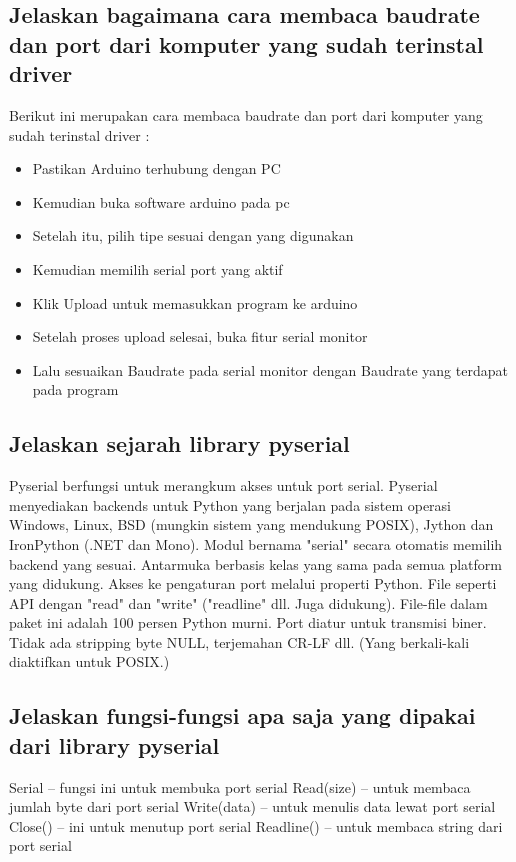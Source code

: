 \subsection{Jelaskan bagaimana cara membaca baudrate dan port dari komputer yang sudah terinstal driver}
Berikut ini merupakan cara membaca baudrate dan port dari komputer yang sudah terinstal driver :
\begin{itemize}
	\item Pastikan Arduino terhubung dengan PC
	\item Kemudian buka software arduino pada pc
	\item Setelah itu, pilih tipe sesuai dengan yang digunakan
	\item Kemudian memilih serial port yang aktif  
	\item Klik Upload untuk memasukkan program ke arduino
	\item Setelah proses upload selesai, buka fitur serial monitor
	\item Lalu sesuaikan Baudrate pada serial monitor dengan Baudrate yang terdapat pada program
\end{itemize}

\subsection{Jelaskan sejarah library pyserial}
Pyserial berfungsi untuk merangkum akses untuk port serial. Pyserial menyediakan backends untuk Python yang berjalan pada sistem operasi Windows, Linux, BSD (mungkin sistem yang mendukung POSIX), Jython dan IronPython (.NET dan Mono). Modul bernama "serial" secara otomatis memilih backend yang sesuai. Antarmuka berbasis kelas yang sama pada semua platform yang didukung.
Akses ke pengaturan port melalui properti Python.
File seperti API dengan "read" dan "write" ("readline" dll. Juga didukung).
File-file dalam paket ini adalah 100 persen Python murni.
Port diatur untuk transmisi biner. Tidak ada stripping byte NULL, terjemahan CR-LF dll. (Yang berkali-kali diaktifkan untuk POSIX.)

\subsection{Jelaskan fungsi-fungsi apa saja yang dipakai dari library pyserial}
Serial – fungsi ini untuk membuka port serial
Read(size) – untuk membaca jumlah byte dari port serial
Write(data) – untuk menulis data lewat port serial
Close() – ini untuk menutup port serial 
Readline() – untuk membaca string dari port serial

